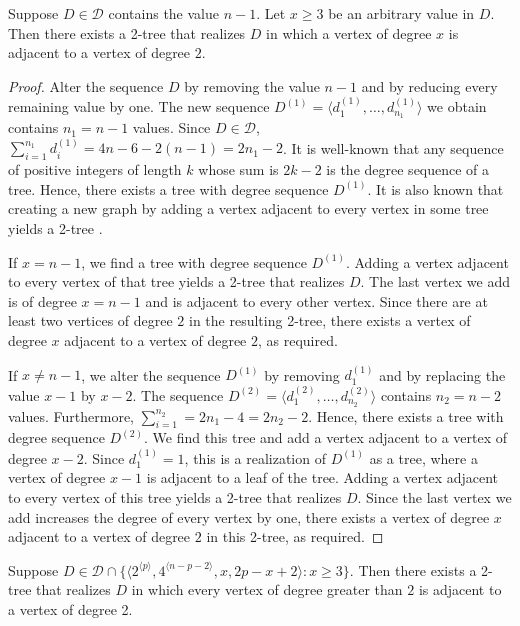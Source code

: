 \documentclass[lotsofwhite,charterfonts]{patmorin}
\newcommand{\rep}[1]{^{\langle#1\rangle}}
\begin{document}
\begin{lem}
Suppose $D\in \mathcal{D}$ contains the value $n-1$. Let $x \geq 3$ be
an arbitrary value in $D$.  Then there exists a 2-tree that realizes
$D$ in which a vertex of degree $x$ is adjacent to a vertex of degree
$2$.
\end{lem}

\begin{proof} 
Alter the sequence $D$ by removing the value $n-1$ and by reducing
every remaining value by one. The new sequence $D^{(1)} = \langle
d_1^{(1)},\ldots,d_{n_1}^{(1)}\rangle$ we obtain contains $n_1 = n-1$
values.  Since $D\in \mathcal{D}$, $\sum_{i=1}^{n_1} d^{(1)}_i= 4n-6 -
2(n-1) = 2n_1-2$. It is well-known that any sequence of positive
integers of length $k$ whose sum is $2k-2$ is the degree sequence of a
tree. Hence, there exists a tree with degree sequence $D^{(1)}$. It is
also known that creating a new graph by adding a vertex adjacent to
every vertex in some tree yields a 2-tree \cite{?}.

If $x = n-1$, we find a tree with degree sequence $D^{(1)}$. Adding a
vertex adjacent to every vertex of that tree yields a 2-tree that
realizes $D$. The last vertex we add is of degree $x = n-1$ and is
adjacent to every other vertex. Since there are at least two vertices
of degree $2$ in the resulting 2-tree, there exists a vertex of degree
$x$ adjacent to a vertex of degree $2$, as required.

If $x \neq n-1$, we alter the sequence $D^{(1)}$ by removing
$d_1^{(1)}$ and by replacing the value $x-1$ by $x-2$. The sequence
$D^{(2)} = \langle d_1^{(2)},\ldots,d_{n_2}^{(2)}\rangle$ contains
$n_2 = n-2$ values. Furthermore, $\sum_{i=1}^{n_2} = 2n_1 - 4 = 2n_2 -
2$. Hence, there exists a tree with degree sequence $D^{(2)}$. We find
this tree and add a vertex adjacent to a vertex of degree $x-2$. Since
$d_1^{(1)} = 1$, this is a realization of $D^{(1)}$ as a tree, where a
vertex of degree $x-1$ is adjacent to a leaf of the tree. Adding a
vertex adjacent to every vertex of this tree yields a 2-tree that
realizes $D$. Since the last vertex we add increases the degree of
every vertex by one, there exists a vertex of degree $x$ adjacent to a
vertex of degree $2$ in this 2-tree, as required.
\end{proof}

\begin{lem}
Suppose $D\in \mathcal{D}\cap \{\langle
2\rep{p},4\rep{n-p-2},x,2p-x+2\rangle:x\ge 3\}$.  Then there exists a 2-tree
that realizes $D$ in which every vertex of degree greater than $2$ is
adjacent to a vertex of degree 2.
\end{lem}
\end{document}
